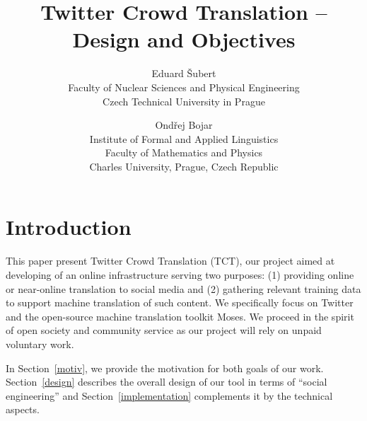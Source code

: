 \setlength{\topmargin}{-.5in}
\setlength{\textheight}{9in}
\setlength{\oddsidemargin}{.125in}
\setlength{\textwidth}{6.25in}

\title{\textbf{Twitter Crowd Translation -- Design and Objectives}}
\author{
Eduard \v{S}ubert\\
Faculty of Nuclear Sciences and Physical Engineering\\
Czech Technical University in Prague
\and
Ond\v{r}ej Bojar\\
Institute of Formal and Applied Linguistics\\
Faculty of Mathematics and Physics\\
Charles University, Prague, Czech Republic
}

\renewcommand{\today}{June 20, 2014}
\maketitle

\def\footurl#1{\footnote{\tt{} #1}}
\def\equo#1{``#1''}

\def\hashtag#1{\texttt{\##1}}

\def\Sref#1{Section~\ref{#1}}
\def\Fref#1{Figure~\ref{#1}}

\maketitle
%
\section{Introduction}

This paper present Twitter Crowd Translation (TCT), our project aimed at
developing of
an online infrastructure serving two
purposes:
(1) providing online or near-online translation to social media and (2)
gathering relevant training data to support machine translation of such content.
We specifically focus on Twitter and the open-source machine translation toolkit
Moses. We proceed in the spirit of open society and community service as our
project will rely on unpaid voluntary work.

In \Sref{motiv}, we provide the motivation for both goals of our work.
\Sref{design} describes the overall design of our tool in terms of
\equo{social engineering} and \Sref{implementation} complements it by the
technical aspects.


